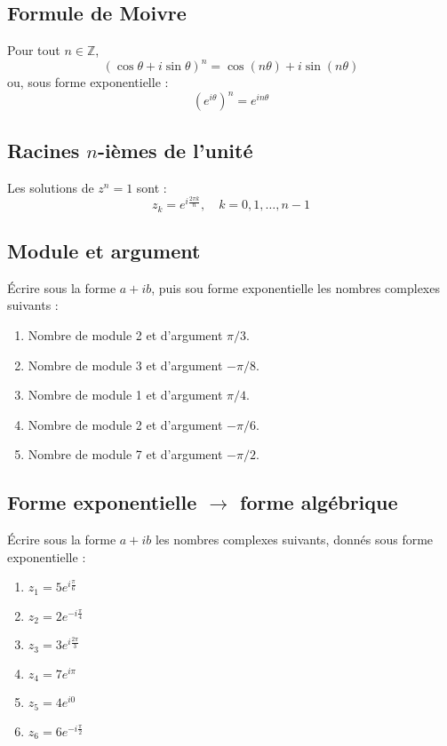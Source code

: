 \subsection*{Formule de Moivre}

Pour tout $n \in \mathbb{Z}$,
\[
\left(\cos\theta + i\sin\theta\right)^n = \cos(n\theta) + i\sin(n\theta)
\]
ou, sous forme exponentielle :
\[
\left(e^{i\theta}\right)^n = e^{in\theta}
\]

\subsection*{Racines $n$-ièmes de l'unité}

Les solutions de $z^n = 1$ sont :
\[
z_k = e^{i\frac{2\pi k}{n}},\quad k = 0, 1, \ldots, n-1
\]



\vspace{3em}

\subsection{Module et argument}

Écrire sous la forme $a+i b$, puis sou forme exponentielle les nombres complexes suivants :
\begin{enumerate}
\item Nombre de module 2 et d'argument $\pi / 3$.
\item Nombre de module 3 et d'argument $-\pi / 8$.
\item Nombre de module 1 et d'argument $\pi / 4$.
\item Nombre de module 2 et d'argument $-\pi / 6$.
\item Nombre de module 7 et d'argument $-\pi / 2$.
\end{enumerate}

\vspace{2em}

\subsection{Forme exponentielle $\rightarrow$ forme algébrique}

Écrire sous la forme $a+ib$ les nombres complexes suivants, donnés sous forme exponentielle :
\begin{multicols}{2}
\begin{enumerate}
    \item $z_1 = 5 e^{i \frac{\pi}{6}}$
    \item $z_2 = 2 e^{-i \frac{\pi}{4}}$
    \item $z_3 = 3 e^{i \frac{2\pi}{3}}$
    \item $z_4 = 7 e^{i \pi}$
    \item $z_5 = 4 e^{i 0}$
    \item $z_6 = 6 e^{-i \frac{\pi}{2}}$
\end{enumerate}
\end{multicols}


